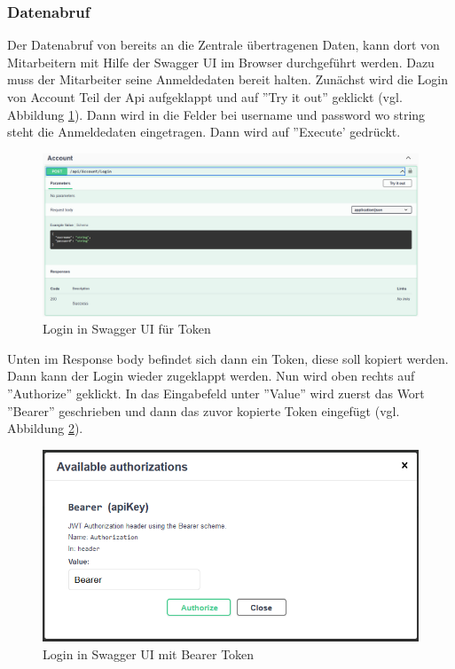 \subsubsection{Datenabruf}
Der Datenabruf von bereits an die Zentrale übertragenen Daten, kann dort von Mitarbeitern mit Hilfe der Swagger UI im Browser durchgeführt werden. Dazu muss der Mitarbeiter seine Anmeldedaten bereit halten. Zunächst wird die Login von Account Teil der Api aufgeklappt und auf ''Try it out'' geklickt (vgl. Abbildung \ref{fig:projektmesseswagger1}). Dann wird in die Felder bei username und password wo string steht die Anmeldedaten eingetragen. Dann wird auf ''Execute' gedrückt. 

\begin{figure}[h]
	\centering
	\includegraphics[width=0.9\linewidth]{Images/Projekt_Messe_Swagger1}
	\caption{Login in Swagger UI für Token}
	\label{fig:projektmesseswagger1}
\end{figure}

Unten im Response body befindet sich dann ein Token, diese soll kopiert werden. Dann kann der Login wieder zugeklappt werden. Nun wird oben rechts auf ''Authorize'' geklickt. In das Eingabefeld unter ''Value'' wird zuerst das Wort ''Bearer'' geschrieben und dann das zuvor kopierte Token eingefügt (vgl. Abbildung \ref{fig:projektmesseswagger2}).

\begin{figure}[h]
	\centering
	\includegraphics[width=0.7\linewidth]{Images/Projekt_Messe_Swagger2}
	\caption{Login in Swagger UI mit Bearer Token}
	\label{fig:projektmesseswagger2}
\end{figure}


